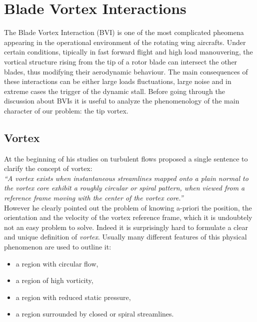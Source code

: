 \chapter{Blade Vortex Interactions}
The Blade Vortex Interaction (BVI) is one of the most complicated pheomena appearing in the operational environment of the rotating wing aircrafts. Under certain conditions, tipically in fast forward flight and high load manouvering, the vortical structure rising from the tip of a rotor blade can intersect the other blades, thus modifying their aerodynamic behaviour. The main consequences of these interactions can be either large loads fluctuations, large noise and in extreme cases the trigger of the dynamic stall. Before going through the discussion about BVIs it is useful to analyze the phenomenology of the main character of our problem: the tip vortex.

\section{Vortex}

At the beginning of his studies on turbulent flows \textcite{Robinson90} proposed a single sentence to clarify the concept of vortex:\\

\textit{“A vortex exists when instantaneous streamlines mapped onto a plain normal to the vortex core exhibit a roughly circular or spiral pattern, when viewed from a reference frame moving with the center of the vortex core.”}\\

However he clearly pointed out the problem of knowing a-priori the position, the orientation and the velocity of the vortex reference frame,  which it is undoubtely not an easy problem to solve. Indeed it is surprisingly hard to formulate a clear and unique definition of \textit{vortex}. Usually many different features of this physical phenomenon are used to outline it:

\begin{itemize}
	\item a region with circular flow,
	\item a region of high vorticity,
	\item a region with reduced static pressure,
	\item a region surrounded by closed or spiral streamlines.
\end{itemize}


